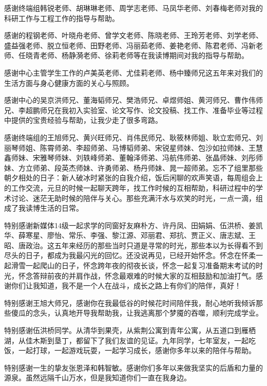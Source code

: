 感谢终端组韩锐老师、胡琳琳老师、周学志老师、马凤华老师、刘春梅老师对我的科研工作与工程工作的指导与帮助。

感谢的程钢老师、叶晓舟老师、曾学文老师、陈晓老师、王玲芳老师、刘学老师、盛益强老师、脱立恒老师、田野老师、冯丽茹老师、姜艳老师、陈君老师、冯新老师、任晓青老师、杨静漪老师、徐莉老师等在我读博期间对我的指导与帮助。

感谢中心主管学生工作的卢美英老师、尤佳莉老师、杨中臻师兄这五年来对我们的生活方面与身心健康方面的关心与照顾。

感谢中心的吴京洪师兄、董海韬师兄、樊浩师兄、卓煜师姐、黄河师兄、曹作伟师兄、李超鹏师兄在我初入实验室、论文写作、论文投稿、找工作、准备毕业等过程中提供的宝贵经验与帮助，让我少走了很多弯路。

感谢终端组的王旭师兄、黄兴旺师兄、肖伟民师兄、耿筱林师姐、耿立宏师兄、刘丽琴师姐、陈霄师弟、李超师弟、马博韬师弟、宋锐星师妹、包沙如拉师妹、王慧鑫师妹、宋雅琴师妹、刘轶峰师弟、董翰泽师弟、冯航伟师弟、张晶师妹、刘彤师妹、方立师弟、段英杰师妹、许勇师弟、杨丹师妹、晁一超师弟。忘不了组里那些朝夕相处的日子：新人破冰时紧张的自我介绍，饭后闲聊的欢声笑语，每周组会上的工作交流，元旦的时候一起聊天跨年，找工作时候的互相帮助，科研过程中的学术讨论、迷茫无助时候的陪伴与关心。那些充满汗水与欢笑的时光，一点一滴，组成了我读博生活的日常。


特别感谢新媒体14级一起求学的同窗好友麻朴方、许丹凤、田娟娟、伍洪桥、姜凯华、薛寒星、廖怡、常乐、李强、黎江源、邓丽君、郑抗、贾正义、唐志斌、王昭、唐政治。这五年来经历的那些当时只道是寻常的时光，那些本以为长得看不到尽头的日子，都成为我最闪光的回忆。还没说再见，已经开始怀念。怀念在怀柔一起滑雪一起爬山的日子，怀念跨年夜的彻夜长谈，怀念一起复习准备期末考试的时光，怀念答辩前夜的并肩作战，怀念最艰难的时候大家的互相鼓励和加油打气。感谢你们让我知道，我不是一个人在战斗，成长之路上有你们的陪伴，真好！

特别感谢王旭大师兄，感谢你在我最低谷的时候花时间陪伴我，耐心地听我倾诉那些傻瓜的念头，认真地开导我帮助我，让我逃离那个梦魇的吞噬，顺利完成学业。

特别感谢伍洪桥同学。从清华到果壳，从紫荆公寓到青年公寓，从五道口到雁栖湖，从佳木斯到垦丁，都留下了我们友谊的见证。九年同学，七年室友，一起吃饭，一起打球，一起游戏玩耍，一起学习成长，感谢你多年以来的陪伴与帮助。

特别感谢一生的挚友张恩泽和韩智敏。感谢你们多年以来做我坚实的后盾和力量的源泉。虽然远隔千山万水，但是我知道你们一直在我身边。


